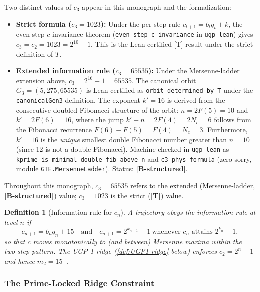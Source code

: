 \documentclass[12pt]{article}
\newtheorem{definition}[theorem]{Definition}
\numberwithin{equation}{section}
\begin{document}
\begin{tcolorbox}[colback=yellow!5,colframe=orange!70!black,title=\textbf{$c_3$ value: two definitions}]
Two distinct values of $c_3$ appear in this monograph and the formalization:
\begin{itemize}[leftmargin=1.5em,itemsep=0.2em]
  \item \textbf{Strict formula ($c_3 = 1023$):} Under the per-step rule $c_{t+1}=b_t q_t + k$, the even-step $c$-invariance theorem (\texttt{even\_step\_c\_invariance} in \texttt{ugp-lean}) gives $c_3 = c_2 = 1023 = 2^{10}-1$. This is the Lean-certified [T] result under the strict definition of $T$.
  \item \textbf{Extended information rule ($c_3 = 65535$):} Under the Mersenne-ladder extension above, $c_3 = 2^{16}-1 = 65535$. The canonical orbit $G_3 = (5,275,65535)$ is Lean-certified as \texttt{orbit\_determined\_by\_T} under the \texttt{canonicalGen3} definition. The exponent $k'=16$ is derived from the consecutive doubled-Fibonacci structure of the orbit: $n = 2F(5) = 10$ and $k' = 2F(6) = 16$, where the jump $k'-n = 2F(4) = 2N_c = 6$ follows from the Fibonacci recurrence $F(6)-F(5) = F(4) = N_c = 3$. Furthermore, $k'=16$ is the \emph{unique} smallest double Fibonacci number greater than $n=10$ (since 12 is not a double Fibonacci). Machine-checked in \texttt{ugp-lean} as \texttt{kprime\_is\_minimal\_double\_fib\_above\_n} and \texttt{c3\_phys\_formula} (zero sorry, module \texttt{GTE.MersenneLadder}). Status: \textbf{[B-structured]}.
\end{itemize}
Throughout this monograph, $c_3 = 65535$ refers to the extended (Mersenne-ladder, \textbf{[B-structured]}) value; $c_3 = 1023$ is the strict (\textbf{[T]}) value.
\end{tcolorbox}

\begin{definition}[Information rule for $c_n$]\label{def:info-rule}
A trajectory obeys the \emph{information rule} at level $n$ if
\[
c_{n+1}=b_n q_n+15\quad\text{and}\quad c_{n+1}=2^{k_{n+1}}-1\ \text{whenever $c_{n}$ attains }2^{k_n}-1,
\]
so that $c$ moves monotonically to (and between) Mersenne maxima within the two-step pattern. The UGP-1 ridge (\cref{def:UGP1-ridge} below) enforces $c_2=2^n-1$ and hence $m_2=15$~\cite{SpivackUGPFormalization,ugp-lean}.
\end{definition}

\subsubsection{The Prime-Locked Ridge Constraint}\label{sec:UGP1-ridge}
\end{document}
